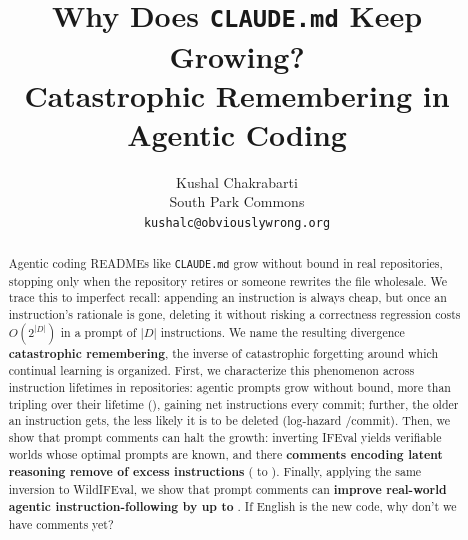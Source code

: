 \documentclass[11pt]{article}
\title{Why Does \texttt{CLAUDE.md} Keep Growing?\\ Catastrophic Remembering in Agentic Coding}
\author{
  Kushal Chakrabarti\\
  South Park Commons\\
  \texttt{kushalc@obviouslywrong.org}
}
\begin{document}
\maketitle

\begin{abstract}
  Agentic coding READMEs like \texttt{CLAUDE.md} grow without bound in real repositories, stopping only when
  the repository retires or someone rewrites the file wholesale.
  We trace this to imperfect recall: appending an instruction is always cheap, but once an instruction's
  rationale is gone, deleting it without risking a correctness regression costs $O(2^{|D|})$ in a prompt of
  $|D|$ instructions.
  We name the resulting divergence \textbf{catastrophic remembering}, the inverse of catastrophic forgetting around
  which continual learning is organized.
  First, we characterize this phenomenon across \FieldSpells{} instruction lifetimes in \FieldRepos{} repositories:
  agentic prompts grow without bound, more than tripling over their lifetime (\FieldGrowthCountPeakPct{}), gaining
  \FieldNetPerCommit{} net instructions every commit; further, the older an instruction gets, the less likely
  it is to be deleted (log-hazard \FieldSlopeCommit{}/commit).
  Then, we show that prompt comments can halt the growth: inverting IFEval yields verifiable worlds
  whose optimal prompts are known, and there \textbf{comments encoding latent reasoning remove
  \HorizonExcessRemovedPct{} of excess instructions} (\HorizonControlExcessPct{} to \HorizonPracticalExcessPct{}).
  Finally, applying the same inversion to WildIFEval, we show that prompt comments can \textbf{improve
  real-world agentic instruction-following by up to \WildDeltaSatPct{}}.
  If English is the new code, why don't we have comments yet?
\end{abstract}














\appendix





\end{document}
